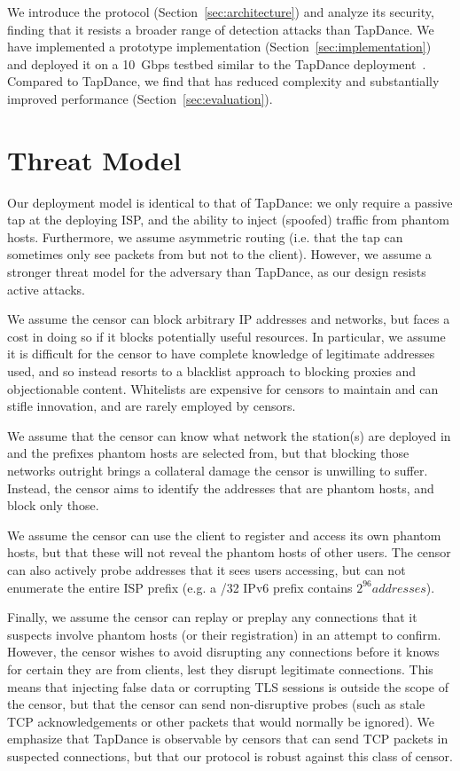 \documentclass[letterpaper,twocolumn,10pt]{article}
\begin{document}

We introduce the \scheme protocol (Section~\ref{sec:architecture})
and analyze its security, finding that it resists a broader
range of detection attacks than TapDance.
We have implemented a prototype implementation (Section~\ref{sec:implementation})
and deployed it on a 10~Gbps testbed similar to the TapDance
deployment~\cite{frolov2017isp}.  Compared to TapDance, we find that
\scheme has reduced complexity and substantially improved performance
(Section~\ref{sec:evaluation}).




\section{Threat Model}


Our deployment model is identical to that of TapDance: we only require a passive
tap at the deploying ISP, and the ability to inject (spoofed) traffic from phantom
hosts.
Furthermore, we assume
asymmetric routing (i.e. that the tap can sometimes only see packets from but not to the
client).
However, we assume a stronger threat model for the adversary than
TapDance, as our design resists active attacks.


We assume the censor can block arbitrary IP addresses and networks, but faces a
cost in doing so if it blocks potentially useful resources. In particular, we
assume it is difficult for the censor to have complete knowledge of legitimate
addresses used, and so instead resorts to a blacklist approach to blocking
proxies and objectionable content.
Whitelists are expensive for censors to maintain and can stifle
innovation, and are rarely employed by censors.


We assume that the censor can know what network the \scheme station(s) are
deployed in and the prefixes phantom hosts are selected from, but that blocking those
networks outright brings a collateral
damage the censor is unwilling to suffer. Instead, the censor aims to identify
the addresses that are phantom hosts, and block only those.

We assume the censor can use the client to register and access its own phantom
hosts, but that these will not reveal the phantom hosts of other users. The
censor can also actively probe addresses that it sees users accessing, but can
not enumerate the entire ISP prefix (e.g. a /32 IPv6 prefix contains
$2^{96} addresses$).

Finally, we assume the censor can replay or preplay any connections that it
suspects involve phantom hosts (or their registration) in an attempt to confirm.
However, the censor wishes to avoid disrupting any connections before it
knows for certain they are from \scheme clients, lest they disrupt legitimate
connections. This means that injecting false data or corrupting TLS sessions is
outside the scope of the censor, but that the censor can send non-disruptive
probes (such as stale TCP acknowledgements or other packets that would normally
be ignored). We emphasize that TapDance is observable by censors that can send
TCP packets in suspected connections, but that our protocol is robust against
this class of censor.
\end{document}
